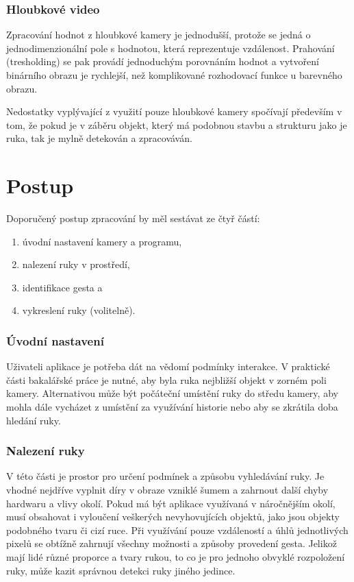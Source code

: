 \subsubsection{Hloubkové video}
Zpracování hodnot z hloubkové kamery je jednodušší, protože se jedná o jednodimenzionální pole s hodnotou, která reprezentuje vzdálenost. Prahování (tresholding) se pak provádí jednoduchým porovnáním hodnot a vytvoření binárního obrazu je rychlejší, než komplikované rozhodovací funkce u barevného obrazu.

Nedostatky vyplývající z využití pouze hloubkové kamery spočívají především v tom, že pokud je v záběru objekt, který má podobnou stavbu a strukturu jako je ruka, tak je mylně detekován a zpracováván.\\

\section{Postup}
Doporučený postup zpracování by měl sestávat ze čtyř částí:

\begin{enumerate}
\item úvodní nastavení kamery a programu,
\item nalezení ruky v prostředí,
\item identifikace gesta a
\item vykreslení ruky (volitelně).
\end{enumerate}

\subsubsection{Úvodní nastavení}
Uživateli aplikace je potřeba dát na vědomí podmínky interakce. V praktické části bakalářské práce je nutné, aby byla ruka nejbližší objekt v zorném poli kamery. Alternativou může být počáteční umístění ruky do středu kamery, aby mohla dále vycházet z umístění za využívání historie nebo aby se zkrátila doba hledání ruky.

\subsubsection{Nalezení ruky}
V této části je prostor pro určení podmínek a způsobu vyhledávání ruky. Je vhodné nejdříve vyplnit díry v obraze vzniklé šumem a zahrnout další chyby hardwaru a vlivy okolí. Pokud má být aplikace využívaná v náročnějším okolí, musí obsahovat i vyloučení veškerých nevyhovujících objektů, jako jsou objekty podobného tvaru či cizí ruce. Při využívání pouze vzdáleností a úhlů jednotlivých pixelů se obtížně zahrnují všechny možnosti a způsoby provedení gesta. Jelikož mají lidé různé proporce a tvary rukou, to co je pro jednoho obvyklé rozpoložení ruky, může kazit správnou detekci ruky jiného jedince.


